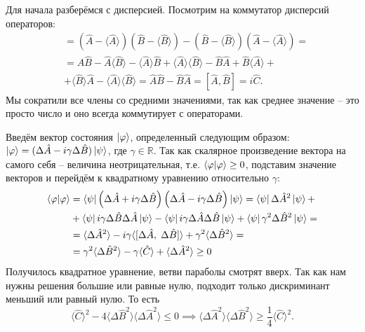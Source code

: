 Для начала разберёмся с дисперсией. Посмотрим на коммутатор дисперсий операторов:
\begin{align*}
    [\Delta \hat A, \Delta \hat B] &= \left( \hat A - \langle \hat A \rangle \right) \left( \hat B - \langle \hat B \rangle \right) - \left( \hat B - \langle \hat B \rangle \right) \left( \hat A - \langle \hat A \rangle \right) =\\
    &= \hat A \hat B - \hat A \langle \hat B \rangle - \langle \hat A \rangle \hat B + \langle \hat A \rangle \langle \hat B \rangle - \hat B \hat A + \hat B \langle \hat A \rangle + \\
    &+ \langle \hat B \rangle \hat A - \langle \hat A \rangle \langle \hat B \rangle = \hat A \hat B - \hat B \hat A = [\hat A, \hat B] = i\hat C.
\end{align*}
Мы сократили все члены со средними значениями, так как среднее значение -- это просто число и оно всегда коммутирует с операторами.

Введём вектор состояния $\ket{\varphi}$, определенный следующим образом: $\ket{\varphi} = (\Delta\hat A - i\gamma\Delta\hat B)\ket{\psi}$, где $\gamma \in \mathbb{R}$. Так как скалярное произведение вектора на самого себя -- величина неотрицательная, т.е. $\bra{\varphi}\ket{\varphi} \geq 0$, подставим значение векторов и перейдём к квадратному уравнению относительно $\gamma$:
\begin{align*}
    \bra{\varphi} \ket{\varphi} &= \bra{\psi} \left( \Delta \hat A + i \gamma \Delta \hat B \right) \left( \Delta \hat A - i \gamma \Delta \hat B \right) \ket{\psi} = \bra{\psi} \Delta \hat{A}^2 \ket{\psi} + \\
    &+ \bra{\psi} i \gamma \Delta \hat{B} \Delta \hat{A} \ket{\psi} - \bra{\psi} i \gamma \Delta \hat{A} \Delta \hat{B} \ket{\psi} + \bra{\psi} \gamma^2 \Delta \hat{B}^2 \ket{\psi} = \\
    &= \langle \Delta \hat A^2 \rangle - i \gamma \langle [\Delta \hat{A}, \; \Delta \hat{B}] \rangle + \gamma^2 \langle \Delta \hat B^2 \rangle = \\
    &= \gamma^2 \langle \Delta \hat B^2 \rangle - \gamma \langle \hat{C} \rangle + \langle \Delta \hat A^2 \rangle \geq 0
\end{align*}
Получилось квадратное уравнение, ветви параболы смотрят вверх. Так как нам нужны решения большие или равные нулю, подходит только дискриминант меньший или равный нулю. То есть
\[
\langle \hat C \rangle^2 - 4 \langle \Delta \hat B^2 \rangle \langle \Delta \hat A^2 \rangle \leq 0 \implies
\langle \Delta \hat A^2 \rangle \langle \Delta \hat B^2 \rangle \geq \frac{1}{4} \langle \hat C \rangle^2.
\]
